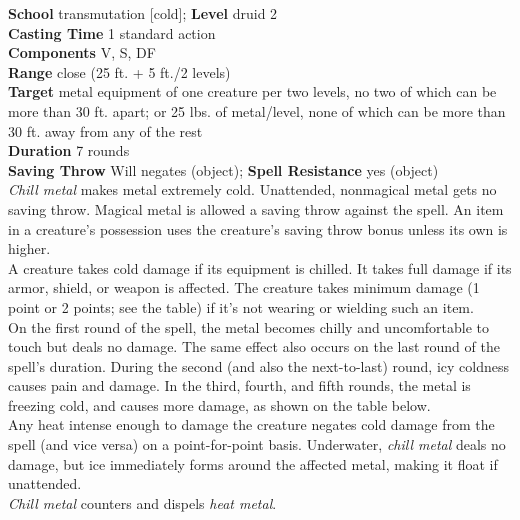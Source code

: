 \textbf{School} transmutation [cold]; \textbf{Level} druid 2\\
\textbf{Casting Time} 1 standard action\\
\textbf{Components} V, S, DF\\
\textbf{Range} close (25 ft. + 5 ft./2 levels)\\
\textbf{Target }metal equipment of one creature per two levels, no two of which can be more than 30 ft. apart; or 25 lbs. of metal/level, none of which can be more than 30 ft. away from any of the rest\\
\textbf{Duration} 7 rounds\\
\textbf{Saving Throw }Will negates (object); \textbf{Spell Resistance} yes (object)\\
\textit{Chill metal }makes metal extremely cold. Unattended, nonmagical metal gets no saving throw. Magical metal is allowed a saving throw against the spell. An item in a creature's possession uses the creature's saving throw bonus unless its own is higher.\\
A creature takes cold damage if its equipment is chilled. It takes full damage if its armor, shield, or weapon is affected. The creature takes minimum damage (1 point or 2 points; see the table) if it's not wearing or wielding such an item.\\
On the first round of the spell, the metal becomes chilly and uncomfortable to touch but deals no damage. The same effect also occurs on the last round of the spell's duration. During the second (and also the next-to-last) round, icy coldness causes pain and damage. In the third, fourth, and fifth rounds, the metal is freezing cold, and causes more damage, as shown on the table below.\\
Any heat intense enough to damage the creature negates cold damage from the spell (and vice versa) on a point-for-point basis. Underwater, \textit{chill metal }deals no damage, but ice immediately forms around the affected metal, making it float if unattended.\\
\textit{Chill metal }counters and dispels \textit{heat metal}.\\
